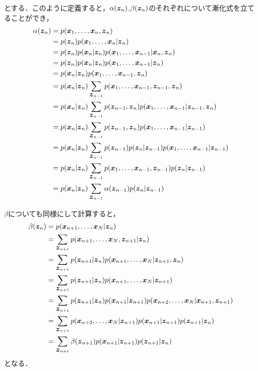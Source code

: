 とする．このように定義すると，$\alpha(\bvec{z}_n)$,$\beta(\bvec{z}_n)$のそれぞれについて漸化式を立てることができ，
\begin{align}
  \alpha(\bvec{z}_n) &= p(\bvec{x}_1,\dots,\bvec{x}_n,\bvec{z}_n) \\
  &= p(\bvec{z}_n)p(\bvec{x}_1,\dots,\bvec{x}_n|\bvec{z}_n) \\
  &= p(\bvec{z}_n)p(\bvec{x}_n|\bvec{z}_n)p(\bvec{x}_1,\dots,\bvec{x}_{n-1}|\bvec{x}_n,\bvec{z}_n) \\
  &= p(\bvec{z}_n)p(\bvec{x}_n|\bvec{z}_n)p(\bvec{x}_1,\dots,\bvec{x}_{n-1}|\bvec{z}_n) \\
  &= p(\bvec{x}_n|\bvec{z}_n)p(\bvec{x}_1,\dots,\bvec{x}_{n-1},\bvec{z}_n) \\
  &= p(\bvec{x}_n|\bvec{z}_n)\sum_{\bvec{z}_{n-1}}p(\bvec{x}_1,\dots,\bvec{x}_{n-1},\bvec{z}_{n-1},\bvec{z}_n) \\
  &= p(\bvec{x}_n|\bvec{z}_n)\sum_{\bvec{z}_{n-1}}p(\bvec{z}_{n-1},\bvec{z}_n)p(\bvec{x}_1,\dots,\bvec{x}_{n-1}|\bvec{z}_{n-1},\bvec{z}_n) \\
  &= p(\bvec{x}_n|\bvec{z}_n)\sum_{\bvec{z}_{n-1}}p(\bvec{z}_{n-1},\bvec{z}_n)p(\bvec{x}_1,\dots,\bvec{x}_{n-1}|\bvec{z}_{n-1}) \\
  &= p(\bvec{x}_n|\bvec{z}_n)\sum_{\bvec{z}_{n-1}}p(\bvec{z}_{n-1})p(\bvec{z}_n|\bvec{z}_{n-1})p(\bvec{x}_1,\dots,\bvec{x}_{n-1}|\bvec{z}_{n-1}) \\
  &= p(\bvec{x}_n|\bvec{z}_n)\sum_{\bvec{z}_{n-1}}p(\bvec{x}_1,\dots,\bvec{x}_{n-1},\bvec{z}_{n-1})p(\bvec{z}_n|\bvec{z}_{n-1}) \\
  &= p(\bvec{x}_n|\bvec{z}_n)\sum_{\bvec{z}_{n-1}}\alpha(\bvec{z}_{n-1})p(\bvec{z}_n|\bvec{z}_{n-1}) \label{eq:alpha-recursive}
\end{align}

$\beta$についても同様にして計算すると，
\begin{align}
  \beta(\bvec{z}_n) &= p(\bvec{x}_{n+1},\dots,\bvec{x}_N|\bvec{z}_n) \\
  &= \sum_{\bvec{z}_{n+1}}p(\bvec{x}_{n+1},\dots,\bvec{x}_N,\bvec{z}_{n+1}|\bvec{z}_n) \\
  &= \sum_{\bvec{z}_{n+1}}p(\bvec{z}_{n+1}|\bvec{z}_n)p(\bvec{x}_{n+1},\dots,\bvec{x}_N|\bvec{z}_{n+1},\bvec{z}_n) \\
  &= \sum_{\bvec{z}_{n+1}}p(\bvec{z}_{n+1}|\bvec{z}_n)p(\bvec{x}_{n+1},\dots,\bvec{x}_N|\bvec{z}_{n+1}) \\
  &= \sum_{\bvec{z}_{n+1}}p(\bvec{z}_{n+1}|\bvec{z}_n)p(\bvec{x}_{n+1}|\bvec{z}_{n+1})p(\bvec{x}_{n+2},\dots,\bvec{x}_N|\bvec{x}_{n+1},\bvec{z}_{n+1}) \\
  &= \sum_{\bvec{z}_{n+1}}p(\bvec{x}_{n+2},\dots,\bvec{x}_N|\bvec{z}_{n+1})p(\bvec{x}_{n+1}|\bvec{z}_{n+1})p(\bvec{z}_{n+1}|\bvec{z}_n) \\
  &= \sum_{\bvec{z}_{n+1}}\beta(\bvec{z}_{n+1})p(\bvec{x}_{n+1}|\bvec{z}_{n+1})p(\bvec{z}_{n+1}|\bvec{z}_n) \label{eq:beta-recursive}
\end{align}
となる．

